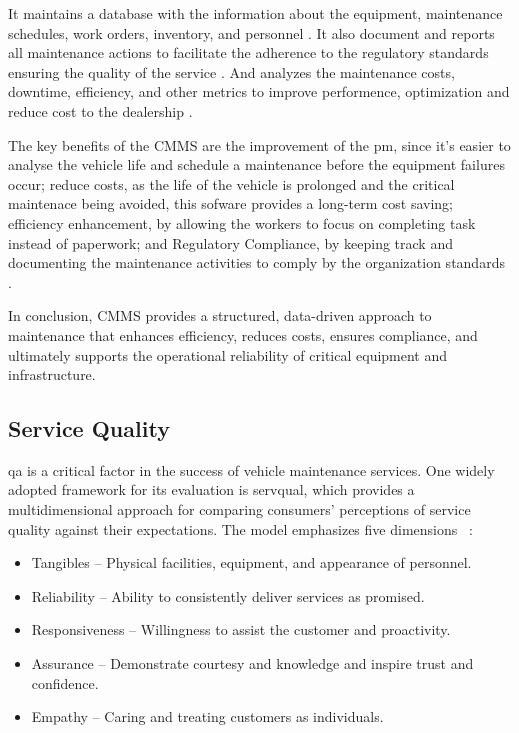 It maintains a database with the information about the equipment, maintenance schedules, work orders, inventory, and personnel \cite{inbook}. 
It also document and reports all maintenance actions to facilitate the adherence to the regulatory standards ensuring the quality of the service \cite{Ibm_2025a}. 
And analyzes the maintenance costs, downtime, efficiency, and other metrics to improve performence, optimization and reduce cost to the dealership \cite{Accruent_2025}.

The key benefits of the \ac{CMMS} are the improvement of the \acs{pm}, since it's easier to analyse the vehicle life and schedule a maintenance before the equipment failures occur; reduce costs, as the life of the vehicle is prolonged and the critical maintenace being avoided, this sofware provides a long-term cost saving; efficiency enhancement, by allowing the workers to focus on completing task instead of paperwork; and Regulatory Compliance, by keeping track and documenting the maintenance activities to comply by the organization standards \cite{Aptean_2023}. 

In conclusion, \ac{CMMS} provides a structured, data-driven approach to maintenance that enhances efficiency, reduces costs, ensures compliance, and ultimately supports the operational reliability of critical equipment and infrastructure.





\subsection{Service Quality}

\ac{qa} is a critical factor in the success of vehicle maintenance services. One widely adopted framework for its evaluation is \ac{servqual}, which provides a multidimensional approach for comparing consumers' perceptions of service quality against their expectations. The model emphasizes five dimensions ~\cite{SERVQUAL_OLD}:


\begin{itemize}
   \item Tangibles – Physical facilities, equipment, and appearance of personnel.
   \item Reliability – Ability to consistently deliver services as promised.
   \item Responsiveness – Willingness to assist the customer and proactivity.
   \item Assurance – Demonstrate courtesy and knowledge and inspire trust and confidence.
   \item Empathy – Caring and treating customers as individuals.
  \end{itemize}

